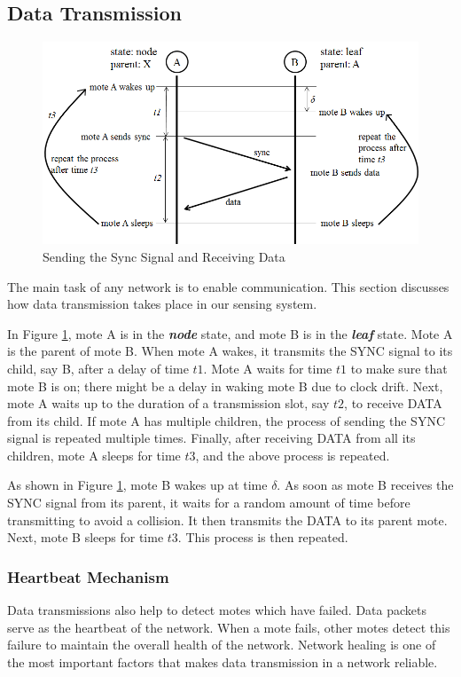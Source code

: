 \subsection{Data Transmission}
\begin{figure}[htbp]
\centering
\includegraphics[width=\columnwidth]{algorithm2.png}
\caption{Sending the Sync Signal and Receiving Data}
\label{img_algorithm2}
\end{figure}

The main task of any network is to enable communication. This section discusses how data transmission takes place in our sensing system.

In Figure \ref{img_algorithm2}, mote A is in the \textit{\textbf{node}} state, and mote B is in the \textit{\textbf{leaf}} state. Mote A is the parent of mote B. When mote A wakes, it transmits the SYNC signal to its child, say B, after a delay of time $t1$. Mote A waits for time $t1$ to make sure that mote B is on; there might be a delay in waking mote B due to clock drift. Next, mote A waits up to the duration of a transmission slot, say $t2$, to receive DATA from its child. If mote A has multiple children, the process of sending the SYNC signal is repeated multiple times. Finally, after receiving DATA from all its children, mote A sleeps for time $t3$, and the above process is repeated.

As shown in Figure \ref{img_algorithm2}, mote B wakes up at time $\delta$. As soon as mote B receives the SYNC signal from its parent, it waits for a random amount of time before transmitting to avoid a collision. It then transmits the DATA to its parent mote. Next, mote B sleeps for time $t3$. This process is then repeated.

\subsubsection{Heartbeat Mechanism}
Data transmissions also help to detect motes which have failed. Data packets serve as the heartbeat of the network. When a mote fails, other motes detect this failure to maintain the overall health of the network. Network healing is one of the most important factors that makes data transmission in a network reliable.

